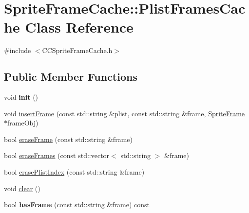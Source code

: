 \hypertarget{classSpriteFrameCache_1_1PlistFramesCache}{}\section{Sprite\+Frame\+Cache\+:\+:Plist\+Frames\+Cache Class Reference}
\label{classSpriteFrameCache_1_1PlistFramesCache}


{\ttfamily \#include $<$C\+C\+Sprite\+Frame\+Cache.\+h$>$}

\subsection*{Public Member Functions}
\begin{DoxyCompactItemize}
\item 
\mbox{\label{classSpriteFrameCache_1_1PlistFramesCache_af16db1d91d952f913928c30b11e162e3}} 
void {\bfseries init} ()
\item 
void \hyperlink{classSpriteFrameCache_1_1PlistFramesCache_a3b71e2f7372224a7467ac0505d895b57}{insert\+Frame} (const std\+::string \&plist, const std\+::string \&frame, \hyperlink{classSpriteFrame}{Sprite\+Frame} $\ast$frame\+Obj)
\item 
bool \hyperlink{classSpriteFrameCache_1_1PlistFramesCache_a27180d29aad8e03af8fde5b93e967737}{erase\+Frame} (const std\+::string \&frame)
\item 
bool \hyperlink{classSpriteFrameCache_1_1PlistFramesCache_aafc3a67e1a20eb0a49f314638f86d0ac}{erase\+Frames} (const std\+::vector$<$ std\+::string $>$ \&frame)
\item 
bool \hyperlink{classSpriteFrameCache_1_1PlistFramesCache_a95905a9336483b1475a71237cfc875ff}{erase\+Plist\+Index} (const std\+::string \&frame)
\item 
void \hyperlink{classSpriteFrameCache_1_1PlistFramesCache_a57282d76fa3158b1807905d9a7d4d622}{clear} ()
\item 
\mbox{\label{classSpriteFrameCache_1_1PlistFramesCache_a22ffb3ee6d836080deb648f319a77a20}} 
bool {\bfseries has\+Frame} (const std\+::string \&frame) const
\item 
\mbox{\label{classSpriteFrameCache_1_1PlistFramesCache_aa13ce5831036ea0f44e06f7f01ec373c}} 

\end{DoxyCompactItemize}
